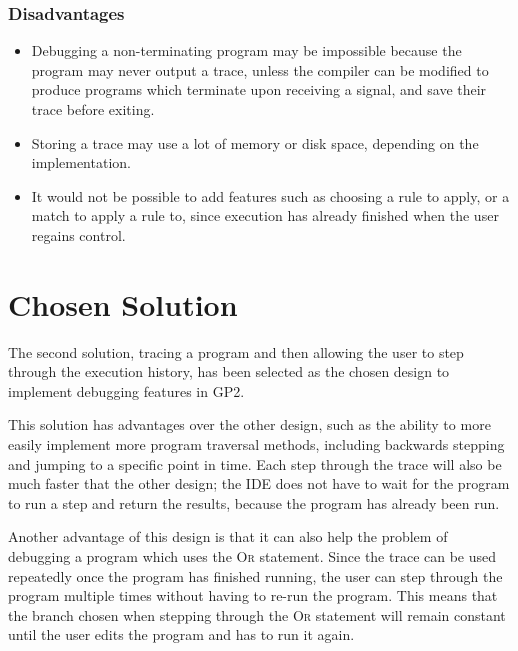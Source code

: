 \documentclass[authoryearcitations]{UoYCSproject}
\begin{document}

\subsubsection{Disadvantages}
\label{sec:ProposedDesign2Disadvantages}

\begin{itemize}
    \item Debugging a non-terminating program may be impossible because the
          program may never output a trace, unless the compiler can be modified
          to produce programs which terminate upon receiving a signal, and save
          their trace before exiting.

    \item Storing a trace may use a lot of memory or disk space, depending on
          the implementation.

    \item It would not be possible to add features such as choosing a
          rule to apply, or a match to apply a rule to, since execution has
          already finished when the user regains control.
\end{itemize}


\section{Chosen Solution}
\label{sec:ChosenSolution}

The second solution, tracing a program and then allowing the user to step through
the execution history, has been selected as the chosen design to implement
debugging features in GP2.

This solution has advantages over the other design, such as the ability to
more easily implement more program traversal methods, including backwards
stepping and jumping to a specific point in time. Each step through the trace
will also be much faster that the other design; the IDE does not have to wait
for the program to run a step and return the results, because the program has
already been run.

Another advantage of this design is that it can also help the problem of debugging
a program which uses the \textsc{Or} statement. Since the trace can be used
repeatedly once the program has finished running, the user can step through the
program multiple times without having to re-run the program. This means that 
the branch chosen when stepping through the \textsc{Or} statement will remain
constant until the user edits the program and has to run it again.
\end{document}
